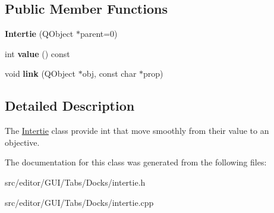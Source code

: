 \subsection*{Public Member Functions}
\begin{DoxyCompactItemize}
\item 
\hypertarget{class_intertie_a5db7f747092208768bc932a15c69fae9}{}\label{class_intertie_a5db7f747092208768bc932a15c69fae9} 
{\bfseries Intertie} (Q\+Object $\ast$parent=0)
\item 
\hypertarget{class_intertie_a6f390897dc28f0c72ea4bbae24c1537a}{}\label{class_intertie_a6f390897dc28f0c72ea4bbae24c1537a} 
int {\bfseries value} () const
\item 
\hypertarget{class_intertie_a86e5f0e4e5ef985586ccc7596db29c3b}{}\label{class_intertie_a86e5f0e4e5ef985586ccc7596db29c3b} 
void {\bfseries link} (Q\+Object $\ast$obj, const char $\ast$prop)
\end{DoxyCompactItemize}


\subsection{Detailed Description}
The \hyperlink{class_intertie}{Intertie} class provide int that move smoothly from their value to an objective. 

The documentation for this class was generated from the following files\+:\begin{DoxyCompactItemize}
\item 
src/editor/\+G\+U\+I/\+Tabs/\+Docks/intertie.\+h\item 
src/editor/\+G\+U\+I/\+Tabs/\+Docks/intertie.\+cpp\end{DoxyCompactItemize}
